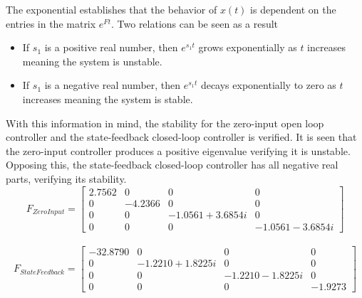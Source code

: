 \documentclass[12pt]{article}
\begin{document}
The exponential establishes that the behavior of $x(t)$ is dependent on the entries in the matrix $e^{Ft}$. Two relations can be seen as a result
\begin{itemize}
  \item If $s_1$ is a positive real number, then $e^{s_1 t}$ grows exponentially as $t$ increases meaning the system is unstable.
  \item If $s_1$ is a negative real number, then $e^{s_1 t}$ decays exponentially to zero as $t$ increases meaning the system is stable.
\end{itemize}
With this information in mind, the stability for the zero-input open loop controller and the state-feedback closed-loop controller is verified. It is seen that the zero-input controller produces a positive eigenvalue verifying it is unstable. Opposing this, the state-feedback closed-loop controller has all negative real parts, verifying its stability.
\begin{equation*}
F_{ZeroInput}= 
\begin{bmatrix} 
2.7562 & 0 & 0 & 0
\\
0 & -4.2366 & 0 & 0
\\
0 & 0 & -1.0561 + 3.6854i & 0
\\
0 & 0 & 0 & -1.0561 - 3.6854i
\end{bmatrix}
\end{equation*}
\\
\begin{equation*} 
F_{StateFeedback}= 
\begin{bmatrix} 
-32.8790  & 0 & 0 & 0
\\
0 & -1.2210 + 1.8225i & 0 & 0
\\
0 & 0 & -1.2210 - 1.8225i & 0
\\
0 & 0 & 0 & -1.9273
\end{bmatrix}
\end{equation*}
\end{document}
